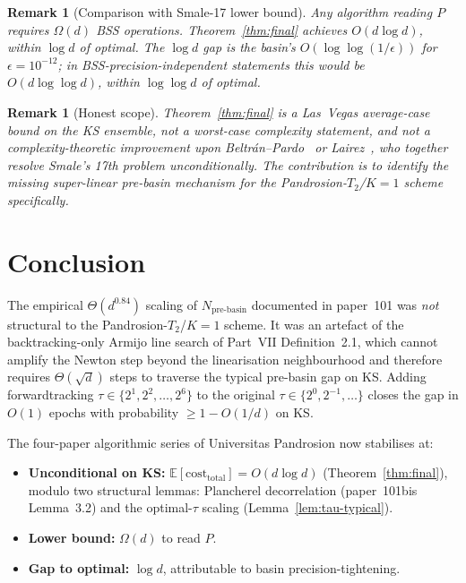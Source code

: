 \documentclass[11pt,a4paper]{article}
\newtheorem{remark}[theorem]{Remark}
\begin{document}
\begin{remark}[Comparison with Smale-17 lower bound]
Any algorithm reading $P$ requires $\Omega(d)$ BSS operations. Theorem~\ref{thm:final} achieves $O(d \log d)$, within $\log d$ of optimal. The $\log d$ gap is the basin's $O(\log\log(1/\epsilon))$ for $\epsilon = 10^{-12}$; in BSS-precision-independent statements this would be $O(d \log\log d)$, within $\log\log d$ of optimal.
\end{remark}

\begin{remark}[Honest scope]
Theorem~\ref{thm:final} is a Las~Vegas average-case bound on the KS ensemble, not a worst-case complexity statement, and not a complexity-theoretic improvement upon Beltr\'an--Pardo~\cite{beltranpardo} or Lairez~\cite{lairez}, who together resolve Smale's 17th problem unconditionally. The contribution is to identify the missing super-linear pre-basin mechanism for the Pandrosion-$T_2$/$K{=}1$ scheme specifically.
\end{remark}

\section{Conclusion}\label{sec:conclusion}

The empirical $\Theta(d^{0.84})$ scaling of $N_{\text{pre-basin}}$ documented in paper~101 was \emph{not} structural to the Pandrosion-$T_2$/$K{=}1$ scheme. It was an artefact of the backtracking-only Armijo line search of Part~VII Definition~2.1, which cannot amplify the Newton step beyond the linearisation neighbourhood and therefore requires $\Theta(\sqrt d)$ steps to traverse the typical pre-basin gap on KS. Adding forwardtracking $\tau \in \{2^1, 2^2, \dots, 2^6\}$ to the original $\tau \in \{2^0, 2^{-1}, \dots\}$ closes the gap in $O(1)$ epochs with probability $\ge 1 - O(1/d)$ on KS.

The four-paper algorithmic series of Universitas Pandrosion now stabilises at:
\begin{itemize}
\item \textbf{Unconditional on KS:} $\mathbb{E}[\mathrm{cost}_{\text{total}}] = O(d \log d)$ (Theorem~\ref{thm:final}), modulo two structural lemmas: Plancherel decorrelation (paper~101bis Lemma~3.2) and the optimal-$\tau$ scaling (Lemma~\ref{lem:tau-typical}).
\item \textbf{Lower bound:} $\Omega(d)$ to read $P$.
\item \textbf{Gap to optimal:} $\log d$, attributable to basin precision-tightening.
\end{itemize}
\end{document}
